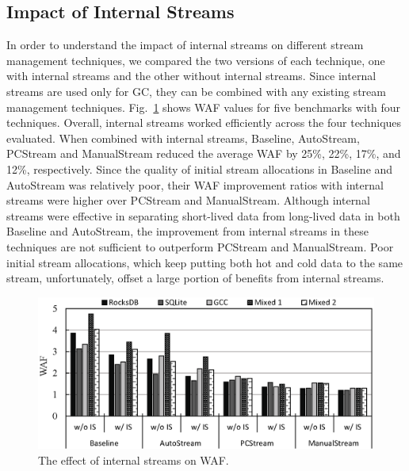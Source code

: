 \vspace{-15pt}
\subsection{Impact of Internal Streams}

In order to understand the impact of internal streams on different stream
management techniques, we compared the two versions of each technique, one with
internal streams and the other without internal streams.  Since internal
streams are used only for GC, they can be combined with any
existing stream management techniques.  Fig.~\ref{fig:internal} shows WAF values
for five benchmarks with four techniques.  Overall, internal streams worked
efficiently across the four techniques evaluated.   When combined with
internal streams, \textsf{\small Baseline}, \textsf{\small AutoStream},
\textsf{\small PCStream} and \textsf{\small ManualStream} reduced the average
WAF by 25\%, 22\%, 17\%, and 12\%, respectively.  Since the quality of initial
stream allocations in \textsf{\small Baseline} and \textsf{\small AutoStream}
was relatively poor, their WAF improvement ratios with internal streams were
higher over \textsf{\small PCStream} and \textsf{\small ManualStream}.
Although internal streams were effective in separating short-lived data from
long-lived data in both \textsf{\small Baseline} and \textsf{\small
AutoStream}, the improvement from internal streams in these techniques are not
sufficient to outperform \textsf{\small PCStream} and \textsf{\small
ManualStream}.  Poor initial stream allocations, which keep putting both hot
and cold data to the same stream, unfortunately, offset a large portion of
benefits from internal streams.


\begin{figure}[t]
	\centering
	\includegraphics[width=1.\linewidth]{figure/internal}
	\caption{The effect of internal streams on WAF.}
	\vspace{-5pt}
	\label{fig:internal}
	\vspace{-10pt}
\end{figure}

